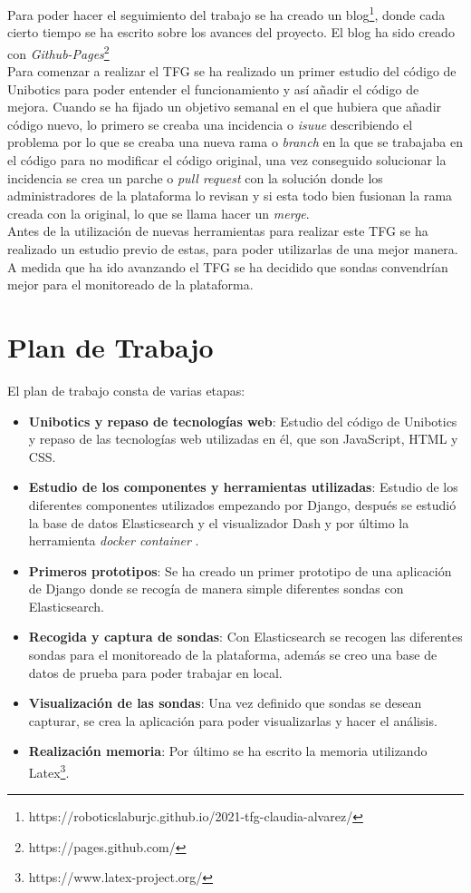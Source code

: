Para poder hacer el seguimiento del trabajo se ha creado un blog\footnote{https://roboticslaburjc.github.io/2021-tfg-claudia-alvarez/}, donde cada cierto tiempo se ha escrito sobre los avances del proyecto. El blog ha sido creado con \textit{Github-Pages}\footnote{https://pages.github.com/}\\

Para comenzar a realizar el TFG se ha realizado un primer estudio del código de Unibotics para poder entender el funcionamiento y así añadir el código de mejora. Cuando se ha fijado un objetivo semanal en el que hubiera que añadir código nuevo, lo primero se creaba una incidencia o \textit{isuue} describiendo el problema por lo que se creaba una nueva rama o \textit{branch } en la que se trabajaba en el código para no modificar el código original, una vez conseguido solucionar la incidencia se crea un parche o \textit{pull request} con la solución donde los administradores de la plataforma lo revisan y si esta todo bien fusionan la rama creada con la original, lo que se llama hacer un \textit{merge}.\\

Antes de la utilización de nuevas herramientas para realizar este TFG se ha realizado un estudio previo de estas, para poder utilizarlas de una mejor manera. A medida que ha ido avanzando el TFG se ha decidido que sondas convendrían mejor para el monitoreado de la plataforma.

\newpage
\section{Plan de Trabajo}
El plan de trabajo consta de varias etapas:

\begin{itemize}
\item \textbf{Unibotics  y repaso de tecnologías web}: Estudio del código de Unibotics y repaso de las tecnologías web utilizadas en él, que son JavaScript, HTML y CSS.

\item \textbf{Estudio de los componentes y herramientas utilizadas}: Estudio de los diferentes componentes utilizados empezando por Django, después se estudió la base de datos Elasticsearch y el visualizador Dash y por último la herramienta \textit{docker container} .

\item \textbf{Primeros prototipos}: Se ha creado un primer prototipo de una aplicación de Django donde se recogía de manera simple diferentes sondas con Elasticsearch.

\item \textbf{Recogida y captura de sondas}: Con Elasticsearch se recogen las diferentes sondas para el monitoreado de la plataforma, además se creo una base de datos de prueba para poder trabajar en local.
\item \textbf{Visualización de las sondas}: Una vez definido que sondas se desean capturar, se crea la aplicación para poder visualizarlas y hacer el análisis.
\item \textbf{Realización memoria}: Por último se ha escrito la memoria utilizando Latex\footnote{https://www.latex-project.org/}.
\end{itemize}

